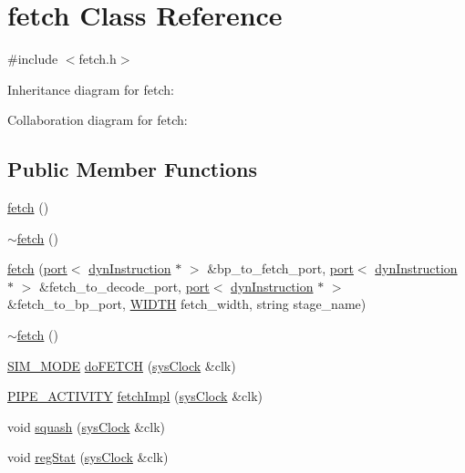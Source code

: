 \hypertarget{classfetch}{
\section{fetch Class Reference}
\label{classfetch}
}


{\ttfamily \#include $<$fetch.h$>$}



Inheritance diagram for fetch:


Collaboration diagram for fetch:
\subsection*{Public Member Functions}
\begin{DoxyCompactItemize}
\item 
\hyperlink{classfetch_ac35d86b42890d4facb56666a58548a8d}{fetch} ()
\item 
\hyperlink{classfetch_a7bb4278b048d48d4225cb44b6553b3d6}{$\sim$fetch} ()
\item 
\hyperlink{classfetch_ad7f7cc7347c967a7843194684f3c3b21}{fetch} (\hyperlink{classport}{port}$<$ \hyperlink{classdynInstruction}{dynInstruction} $\ast$ $>$ \&bp\_\-to\_\-fetch\_\-port, \hyperlink{classport}{port}$<$ \hyperlink{classdynInstruction}{dynInstruction} $\ast$ $>$ \&fetch\_\-to\_\-decode\_\-port, \hyperlink{classport}{port}$<$ \hyperlink{classdynInstruction}{dynInstruction} $\ast$ $>$ \&fetch\_\-to\_\-bp\_\-port, \hyperlink{global_2global_8h_a6fa2e24b8a418fa215e183264cbea3aa}{WIDTH} fetch\_\-width, string stage\_\-name)
\item 
\hyperlink{classfetch_a7bb4278b048d48d4225cb44b6553b3d6}{$\sim$fetch} ()
\item 
\hyperlink{unit_2stage_8h_ac68af0001af4b7049b2435ded74c4e5e}{SIM\_\-MODE} \hyperlink{classfetch_abe2124748be0ac8b2e2b516203f9b194}{doFETCH} (\hyperlink{classsysClock}{sysClock} \&clk)
\item 
\hyperlink{unit_2stage_8h_ab00e4188e8b8974fecb1dfd12764cbb1}{PIPE\_\-ACTIVITY} \hyperlink{classfetch_af1aaa5a5c78172ec27dae140c7dc3ab3}{fetchImpl} (\hyperlink{classsysClock}{sysClock} \&clk)
\item 
void \hyperlink{classfetch_a39b22ed50d3b51ebe311be86343fed2a}{squash} (\hyperlink{classsysClock}{sysClock} \&clk)
\item 
void \hyperlink{classfetch_afd8c8e8e16f0f288d1090d59a85c2281}{regStat} (\hyperlink{classsysClock}{sysClock} \&clk)
\end{DoxyCompactItemize}


